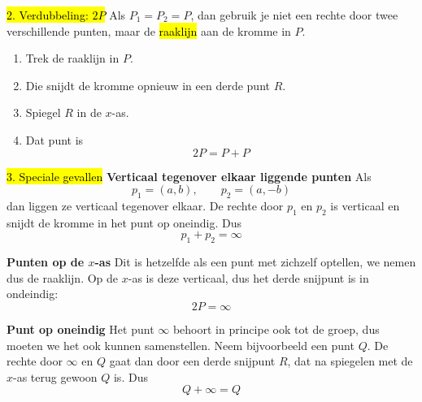 \hl{2. Verdubbeling: $2P$}\newline
Als $P_1 = P_2 = P$, dan gebruik je niet een rechte door twee verschillende punten, maar de \hl{raaklijn} aan de kromme in $P$.
\begin{enumerate}
    \item Trek de raaklijn in $P$.
    \item Die snijdt de kromme opnieuw in een derde punt $R$.
    \item Spiegel $R$ in de $x$-as.
    \item Dat punt is
    \begin{equation*}
        2P = P + P
    \end{equation*}
\end{enumerate}

\hl{3. Speciale gevallen}\newline
\textbf{Verticaal tegenover elkaar liggende punten}\newline
Als
\begin{equation*}
    p_1 = (a,b), \qquad p_2 = (a, -b)
\end{equation*}
dan liggen ze verticaal tegenover elkaar. De rechte door $p_1$ en $p_2$ is verticaal en snijdt de kromme in het punt op oneindig. Dus
\begin{equation*}
    p_1 + p_2 = \infty
\end{equation*}

\textbf{Punten op de $x$-as}\newline
Dit is hetzelfde als een punt met zichzelf optellen, we nemen dus de raaklijn. Op de $x$-as is deze verticaal, dus het derde snijpunt is in ondeindig:
\begin{equation*}
    2P = \infty
\end{equation*}

\begin{center}
\resizebox{1.0\textwidth}{!}{%
    
}
\end{center}

\textbf{Punt op oneindig}\newline
Het punt $\infty$ behoort in principe ook tot de groep, dus moeten we het ook kunnen samenstellen. Neem bijvoorbeeld een punt $Q$. De rechte door $\infty$ en $Q$ gaat dan door een derde snijpunt $R$, dat na spiegelen met de $x$-as terug gewoon $Q$ is. Dus
\begin{equation*}
    Q + \infty = Q
\end{equation*}

\begin{center}
\resizebox{0.75\textwidth}{!}{%
    
}
\end{center}

